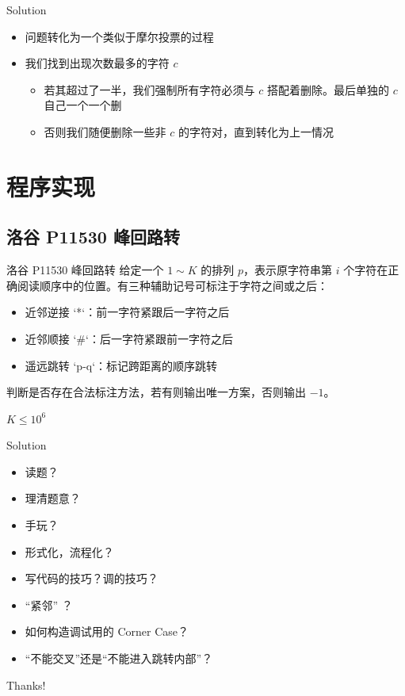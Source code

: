﻿\documentclass[aspectratio=169]{ctexbeamer}
\begin{document}
\begin{frame}{Solution}
    \begin{itemize}
        \item 问题转化为一个类似于摩尔投票的过程
        \item 我们找到出现次数最多的字符 $c$
        \begin{itemize}
            \item 若其超过了一半，我们强制所有字符必须与 $c$ 搭配着删除。最后单独的 $c$ 自己一个一个删
            \item 否则我们随便删除一些非 $c$ 的字符对，直到转化为上一情况
        \end{itemize}
    \end{itemize}
\end{frame}



\section{程序实现}

\subsection{洛谷 P11530 峰回路转}
\begin{frame}{洛谷 P11530 峰回路转}
    给定一个 $1\sim K$ 的排列 $p$，表示原字符串第 $i$ 个字符在正确阅读顺序中的位置。有三种辅助记号可标注于字符之间或之后：
    \begin{itemize}
        \item 近邻逆接 `*`：前一字符紧跟后一字符之后
        \item 近邻顺接 `\#`：后一字符紧跟前一字符之后
        \item 遥远跳转 `p-q`：标记跨距离的顺序跳转
    \end{itemize}
    判断是否存在合法标注方法，若有则输出唯一方案，否则输出 $-1$。
    
    $K\le 10^6$
\end{frame}

\begin{frame}{Solution}
    \begin{itemize}
        \item 读题？
        \item 理清题意？
        \item 手玩？
        \item 形式化，流程化？
        \item 写代码的技巧？调的技巧？
        \item “紧邻” ？
        \item 如何构造调试用的 Corner Case？
        \item “不能交叉”还是“不能进入跳转内部”？
    \end{itemize}
\end{frame}



\begin{frame}
    \begin{center}
        {\Huge\calligra Thanks!}
    \end{center}
\end{frame}
\end{document}
